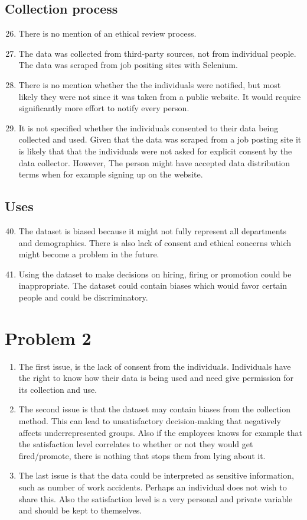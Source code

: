 \documentclass[a4paper]{article}
\newcommand{\enum}[1]{\begin{enumerate}[labelsep=0.3cm,labelwidth=\widthof{\ref{last-item}}, itemindent=0em,leftmargin=!, label=\arabic*).]#1 \end{enumerate}}
\begin{document}
\subsection*{Collection process}
\enum{
\setcounter{enumi}{25}
\item There is no mention of an ethical review process.
\item The data was collected from third-party sources, not from individual people. The data was scraped from job positing sites with Selenium.
\item There is no mention whether the the individuals were notified, but most likely they were not since it was taken from a public website. It would require significantly more effort to notify every person.
\item It is not specified whether the individuals consented to their data being collected and used. Given that the data was scraped from a job posting site it is likely that that the individuals were not asked for explicit consent by the data collector. However, The person might have accepted data distribution terms when for example signing up on the website.
}

\subsection*{Uses}
\enum{
\setcounter{enumi}{39}
\item The dataset is biased because it might not fully represent all departments and demographics. There is also lack of consent and ethical concerns which might become a problem in the future. 
\item Using the dataset to make decisions on hiring, firing or promotion could be inappropriate. The dataset could contain biases which would favor certain people and could be discriminatory. 
}
\section*{Problem 2}
\enum{
\item The first issue, is the lack of consent from the individuals. Individuals have the right to know how their data is being used and need give permission for its collection and use.\\
\item The second issue is that the dataset may contain biases from the collection method. This can lead to unsatisfactory decision-making that negatively affects underrepresented groups. Also if the employees knows for example that the satisfaction level correlates to whether or not they would get fired/promote, there is nothing that stops them from lying about it.\\
\item The last issue is that the data could be interpreted as sensitive information, such as number of work accidents. Perhaps an individual does not wish to share this. Also the satisfaction level is a very personal and private variable and should be kept to themselves. 
}
\end{document}
